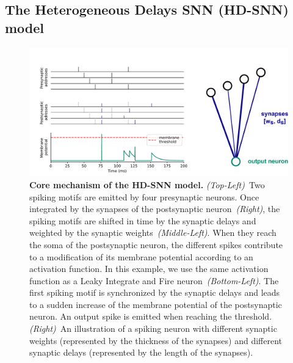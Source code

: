 \documentclass[default]{sn-jnl}%
\theoremstyle{thmstyleone}%
\theoremstyle{thmstyletwo}%
\theoremstyle{thmstylethree}%
\begin{document}
\subsection{The Heterogeneous Delays SNN (HD-SNN) model}
%
\begin{figure}%
    \centering
    \includegraphics[width=0.980\linewidth]{figures/HDSNN_graph.pdf}
  \caption{\textbf{Core mechanism of the HD-SNN model.} \textit{(Top-Left)}~Two spiking motifs are emitted by four presynaptic neurons. Once integrated by the synapses of the postsynaptic neuron~\textit{(Right)}, the spiking motifs are shifted in time by the synaptic delays and weighted by the synaptic weights~\textit{(Middle-Left)}. When they reach the soma of the postsynaptic neuron, the different spikes contribute to a modification of its membrane potential according to an activation function. In this example, we use the same activation function as a Leaky Integrate and Fire neuron~\textit{(Bottom-Left)}. The first spiking motif is synchronized by the synaptic delays and leads to a sudden increase of the membrane potential of the postsynaptic neuron. An output spike is emitted when reaching the threshold. 
  \textit{(Right)}~An illustration of a spiking neuron with different synaptic weights (represented by the thickness of the synapses) and different synaptic delays (represented by the length of the synapses). }%
    \label{fig:izhikevich}%
\end{figure}%
% 
\end{document}

